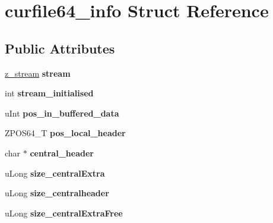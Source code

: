 \hypertarget{structcurfile64__info}{}\section{curfile64\+\_\+info Struct Reference}
\label{structcurfile64__info}
\subsection*{Public Attributes}
\begin{DoxyCompactItemize}
\item 
\mbox{\label{structcurfile64__info_a765936b069e6e2be6d85589614af8583}} 
\hyperlink{structz__stream__s}{z\+\_\+stream} {\bfseries stream}
\item 
\mbox{\label{structcurfile64__info_a43c3fdea776df57014ea61d952972b94}} 
int {\bfseries stream\+\_\+initialised}
\item 
\mbox{\label{structcurfile64__info_a208198f19c7d165203225903455478fd}} 
u\+Int {\bfseries pos\+\_\+in\+\_\+buffered\+\_\+data}
\item 
\mbox{\label{structcurfile64__info_a6225decff0849b90f09a63addab95c64}} 
Z\+P\+O\+S64\+\_\+T {\bfseries pos\+\_\+local\+\_\+header}
\item 
\mbox{\label{structcurfile64__info_aacefe1adf122de0a5885a80944c006a8}} 
char $\ast$ {\bfseries central\+\_\+header}
\item 
\mbox{\label{structcurfile64__info_ab4c965d0fe696204fe23e4efd0cc2edb}} 
u\+Long {\bfseries size\+\_\+central\+Extra}
\item 
\mbox{\label{structcurfile64__info_a17de1df264e0e162f777f2ae7cef0d55}} 
u\+Long {\bfseries size\+\_\+centralheader}
\item 
\mbox{\label{structcurfile64__info_a885ce2d7f41cbac1a2ef990643e62069}} 
u\+Long {\bfseries size\+\_\+central\+Extra\+Free}
\item 
\mbox{\label{structcurfile64__info_a9d4baf5968e4cb192060bcba2d039282}} 

\end{DoxyCompactItemize}

